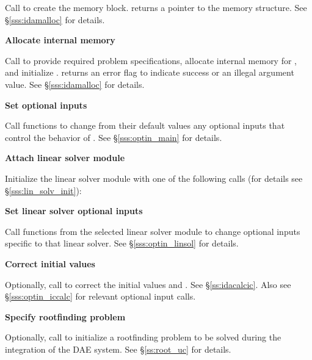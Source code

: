 \begin{Steps}
  Call \id{();} 
  to create the {\ida} memory block.
   returns a pointer to the {\ida} memory structure.
  See \S\ref{sss:idamalloc} for details.

\item\label{i:ida_malloc} 
  {\bf Allocate internal memory}

  Call  
  to provide required problem specifications,
  allocate internal memory for {\ida}, 
  and initialize {\ida}.
   returns an error flag to indicate success or an illegal argument
  value.  See \S\ref{sss:idamalloc} for details.
  
\item
  {\bf Set optional inputs}

  Call  functions to change from their default values any
  optional inputs that control the behavior of {\ida}.
  See \S\ref{sss:optin_main} for details.

\item\label{i:lin_solver} 
  {\bf Attach linear solver module}

  Initialize the linear solver module
  with one of the following calls (for details see \S\ref{sss:lin_solv_init}):

  {\s} 

  {\s} 




\item
  {\bf Set linear solver optional inputs}

  Call  functions from the selected linear solver module to
  change optional inputs specific to that linear solver.
  See \S\ref{sss:optin_linsol} for details.

\item 
  {\bf Correct initial values}

  Optionally, call  to correct the initial values
   and .  See \S\ref{ss:idacalcic}.
  Also see \S\ref{sss:optin_iccalc} for relevant optional input calls.

\item
  {\bf Specify rootfinding problem}

  Optionally, call  to initialize a rootfinding problem
  to be solved during the integration of the DAE system.
  See \S\ref{ss:root_uc} for details.


\end{Steps}
